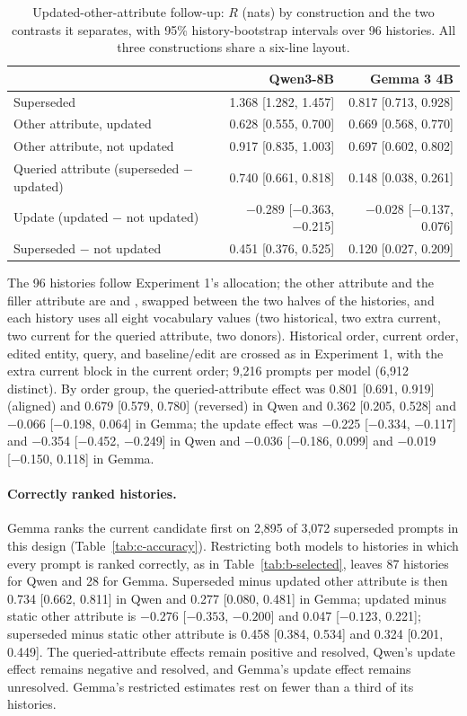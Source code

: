 \begin{table}[t]
\caption{Updated-other-attribute follow-up: $R$ (nats) by construction and the two contrasts it separates, with 95\% history-bootstrap intervals over 96 histories. All three constructions share a six-line layout.}
\label{tab:update}
\begin{center}
\small
\begin{tabular}{@{}lrr@{}}
\toprule
 & Qwen3-8B & Gemma 3 4B \\
\midrule
Superseded & 1.368 [1.282, 1.457] & 0.817 [0.713, 0.928] \\
Other attribute, updated & 0.628 [0.555, 0.700] & 0.669 [0.568, 0.770] \\
Other attribute, not updated & 0.917 [0.835, 1.003] & 0.697 [0.602, 0.802] \\
\midrule
Queried attribute (superseded $-$ updated) & 0.740 [0.661, 0.818] & 0.148 [0.038, 0.261] \\
Update (updated $-$ not updated) & −0.289 [−0.363, −0.215] & −0.028 [−0.137, 0.076] \\
Superseded $-$ not updated & 0.451 [0.376, 0.525] & 0.120 [0.027, 0.209] \\
\bottomrule
\end{tabular}
\end{center}
\end{table}

The 96 histories follow Experiment 1's allocation; the other attribute and the filler attribute are  and , swapped between the two halves of the histories, and each history uses all eight vocabulary values (two historical, two extra current, two current for the queried attribute, two donors). Historical order, current order, edited entity, query, and baseline/edit are crossed as in Experiment 1, with the extra current block in the current order; 9,216 prompts per model (6,912 distinct). By order group, the queried-attribute effect was 0.801 [0.691, 0.919] (aligned) and 0.679 [0.579, 0.780] (reversed) in Qwen and 0.362 [0.205, 0.528] and −0.066 [−0.198, 0.064] in Gemma; the update effect was −0.225 [−0.334, −0.117] and −0.354 [−0.452, −0.249] in Qwen and −0.036 [−0.186, 0.099] and −0.019 [−0.150, 0.118] in Gemma.

\paragraph{Correctly ranked histories.} Gemma ranks the current candidate first on 2,895 of 3,072 superseded prompts in this design (Table~\ref{tab:c-accuracy}). Restricting both models to histories in which every prompt is ranked correctly, as in Table~\ref{tab:b-selected}, leaves 87 histories for Qwen and 28 for Gemma. Superseded minus updated other attribute is then 0.734 [0.662, 0.811] in Qwen and 0.277 [0.080, 0.481] in Gemma; updated minus static other attribute is $-0.276$ [$-0.353$, $-0.200$] and 0.047 [$-0.123$, 0.221]; superseded minus static other attribute is 0.458 [0.384, 0.534] and 0.324 [0.201, 0.449]. The queried-attribute effects remain positive and resolved, Qwen's update effect remains negative and resolved, and Gemma's update effect remains unresolved. Gemma's restricted estimates rest on fewer than a third of its histories.

